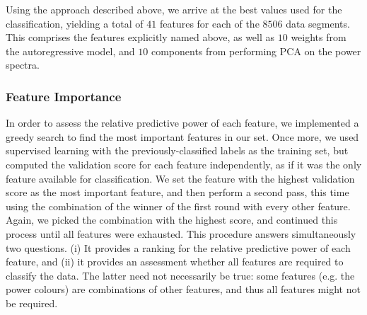 \documentclass[fleqn,usenatbib]{mnras}
\begin{document}
Using the approach described above, we arrive at the best values used for the classification, yielding a total of $41$ features for each of the $8506$ data segments. This comprises the features explicitly named above, as well as $10$ weights from the autoregressive model, and $10$ components from performing PCA on the power spectra.

\subsubsection{Feature Importance}

In order to assess the relative predictive power of each feature, we implemented a greedy search to find the most important features in our set. 
Once more, we used supervised learning with the previously-classified labels as the training set, but computed the validation score for each feature independently, as if it was the only feature available for classification. We set the feature with the highest validation score as the most important feature, and then perform a second pass, this time using the combination of the winner of the first round with every other feature. Again, we picked the combination with the highest score, and continued this process until all features were exhausted. This procedure answers simultaneously two questions. (i) It provides a ranking for the relative predictive power of each feature, and (ii) it provides an assessment whether all features are required to classify the data. The latter need not necessarily be true: some features (e.g. the power colours) are combinations of other features, and thus all features might not be required.
\end{document}
